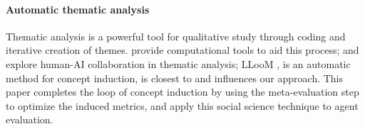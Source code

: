 \paragraph{Automatic thematic analysis} Thematic analysis is a powerful tool for qualitative study through coding and iterative creation of themes. \citet{gauthier2022computational} provide computational tools to aid this process; \citet{hong2022scholastic} and \citet{gebreegziabher2023patat} explore human-AI collaboration in thematic analysis; LLooM \citep{lam2024concept}, is an automatic method for concept induction, is closest to and influences our approach. This paper completes the loop of concept induction by using the meta-evaluation step to optimize the induced metrics, and apply this social science technique to agent evaluation. 